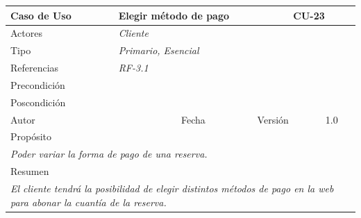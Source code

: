 \begin{table}[H]
    \begin{tabular}{|llllllll|}
    \hline
    \multicolumn{1}{|l|}{Caso de Uso}       & \multicolumn{5}{l|}{Elegir método de pago}                                                                          & \multicolumn{2}{l|}{\cellcolor[HTML]{E6E6E6}CU-23}          \\ \hline
    \multicolumn{1}{|l|}{Actores}           & \multicolumn{7}{l|}{{\color[HTML]{808080} \textit{Cliente}}}                                                                                                                           \\ \hline
    \multicolumn{1}{|l|}{Tipo}              & \multicolumn{7}{l|}{{\color[HTML]{808080} \textit{Primario, Esencial}}}                                                                                                                \\ \hline
    \multicolumn{1}{|l|}{Referencias}       & \multicolumn{2}{l|}{{\color[HTML]{808080} \textit{RF-3.1}}}              & \multicolumn{5}{l|}{}                                                                                       \\ \hline
    \multicolumn{1}{|l|}{Precondición}      & \multicolumn{7}{l|}{}                                                                                                \\ \hline
    \multicolumn{1}{|l|}{Poscondición}      & \multicolumn{7}{l|}{}                                                                                                                                                                  \\ \hline
    \multicolumn{1}{|l|}{Autor}             & \multicolumn{1}{l|}{}                        & \multicolumn{2}{l|}{Fecha}           & \multicolumn{1}{l|}{}     & \multicolumn{2}{l|}{Versión}         & 1.0                           \\ \hline
    \multicolumn{8}{|l|}{\cellcolor[HTML]{F2F2F2}Propósito}                                                                                                                                                                          \\ \hline
    \multicolumn{8}{|p{15cm}|}{{\color[HTML]{808080} \textit{Poder variar la forma de pago de una reserva.}}}                                                                                                           \\ \hline
    \multicolumn{8}{|l|}{\cellcolor[HTML]{F2F2F2}Resumen}                                                                                                                                                                            \\ \hline
    \multicolumn{8}{|p{15cm}|}{{\color[HTML]{808080} \textit{El cliente tendrá la posibilidad de elegir distintos métodos de pago en la web para abonar la cuantía de la reserva.}}} \\ \hline
    \end{tabular}
\end{table}

